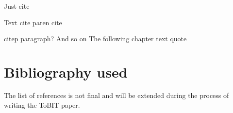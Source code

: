 \documentclass[runningheads]{llncs}
\begin{document}
Just cite \cite{dembsey_closing_2017}
\newline

Text cite \textcite{dembsey_closing_2017}
\newline
paren cite \parencite{dembsey_closing_2017}
\newline

citep paragraph? And so on \citep{dembsey_closing_2017}
The following chapter 
\newline
text quote 
\newline


\section{Bibliography used}
The list of references is not final and will be extended during the process of writing the ToBIT paper.
\printbibliography
\end{document}
